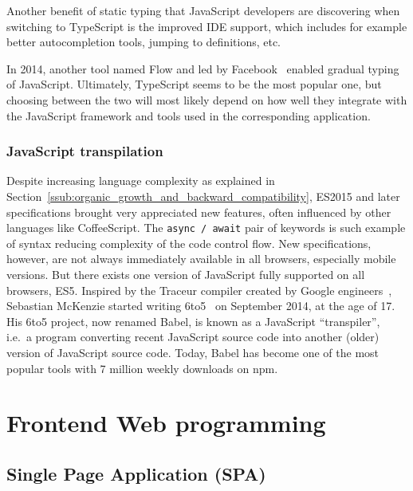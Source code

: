 Another benefit of static typing that JavaScript developers are discovering when
switching to TypeScript is the improved IDE support,
which includes for example better autocompletion tools, jumping to definitions, etc.

In 2014, another tool named Flow and led by Facebook~\cite{chaudhuri2017fast}
enabled gradual typing of JavaScript.
Ultimately, TypeScript seems to be the most popular one,
but choosing between the two will most likely depend on how well they integrate
with the JavaScript framework and tools used in the corresponding application.

\subsubsection{JavaScript transpilation}%
\label{ssub:javascript_transpilation}

Despite increasing language complexity
as explained in Section~\ref{ssub:organic_growth_and_backward_compatibility},
ES2015 and later specifications brought very appreciated new features,
often influenced by other languages like CoffeeScript.
The \verb|async / await| pair of keywords is such example of syntax
reducing complexity of the code control flow.
New specifications, however, are not always immediately available in all browsers,
especially mobile versions.
But there exists one version of JavaScript fully supported on all browsers, ES5.
Inspired by the Traceur compiler created by Google engineers~\cite{traceur},
Sebastian McKenzie started writing \textsf{6to5}~\cite{babel}
on September 2014, at the age of 17.
His \textsf{6to5} project, now renamed Babel, is known as a JavaScript ``transpiler'',
i.e.\ a program converting recent JavaScript source code into another (older) version
of JavaScript source code.
Today, Babel has become one of the most popular tools
with 7 million weekly downloads on \textsf{npm}.


\section{Frontend Web programming}%
\label{sec:frontend_web_programming}


\subsection{Single Page Application (SPA)}%
\label{sub:single_page_application_spa_}


